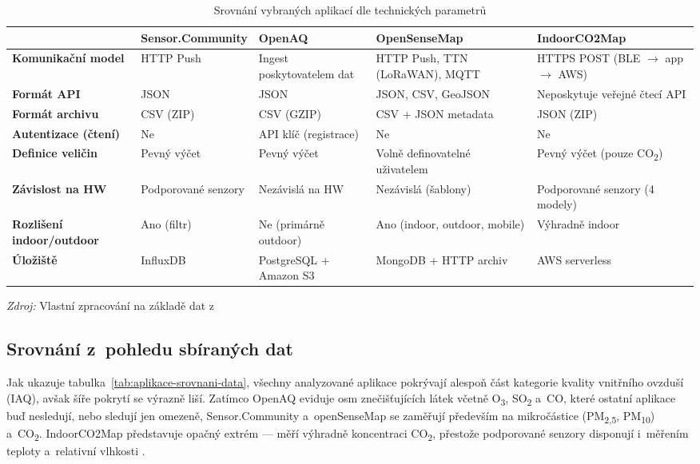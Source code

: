 \begin{table}[!tbp]
  \centering
  \footnotesize
  \setlength{\tabcolsep}{2pt}
  \renewcommand{\arraystretch}{1.1}
  \caption{Srovnání vybraných aplikací dle technických parametrů}
  \label{tab:aplikace-srovnani-technicke}
  \begin{tabular}{p{2.8cm}p{3.1cm}p{3.0cm}p{3.0cm}p{2.7cm}}
    \toprule
     & \textbf{Sensor.Community} & \textbf{OpenAQ} & \textbf{OpenSenseMap} & \textbf{IndoorCO2Map}\\
    \midrule
      \textbf{Komunikační model} & HTTP Push & Ingest poskytovatelem dat & HTTP Push, TTN (LoRaWAN), MQTT & HTTPS POST (BLE $\rightarrow$ app $\rightarrow$ AWS)\\
    \midrule
      \textbf{Formát API} & JSON & JSON & JSON, CSV, {GeoJSON} & Neposkytuje veřejné čtecí API\\
    \midrule
      \textbf{Formát archivu} & CSV (ZIP) & CSV (GZIP) & CSV + JSON metadata & JSON (ZIP)\\
    \midrule
      \textbf{Autentizace (čtení)} & Ne & API klíč (registrace) & Ne & Ne\\
    \midrule
      \textbf{Definice veličin} & Pevný výčet & Pevný výčet & Volně definovatelné uživatelem & Pevný výčet (pouze CO\textsubscript{2})\\
    \midrule
      \textbf{Závislost na HW} & Podporované senzory & Nezávislá na HW & Nezávislá (šablony) & Podporované senzory (4 modely)\\
    \midrule
      \textbf{Rozlišení indoor/outdoor} & Ano (filtr) & Ne (primárně outdoor) & Ano (indoor, outdoor, mobile) & Výhradně indoor\\
    \midrule
      \textbf{Úložiště} & InfluxDB & PostgreSQL + Amazon S3 & MongoDB + HTTP archiv & AWS serverless\\
    \bottomrule
  \end{tabular}

  \footnotesize \textit{Zdroj:} Vlastní zpracování na základě dat z \parencite{Index, APIs, API, zotero-item-552, OpenaqOpenaqapiv22026, aurelwuAurelWuIndoorCO2MapApp2026, zotero-item-571, IndoorCO2Atlas}
\end{table}

\FloatBarrier
\subsection{Srovnání z~pohledu sbíraných dat}

Jak ukazuje tabulka~\ref{tab:aplikace-srovnani-data}, všechny analyzované aplikace pokrývají alespoň část kategorie kvality vnitřního ovzduší (IAQ), avšak šíře pokrytí se výrazně liší. Zatímco OpenAQ eviduje osm znečišťujících látek včetně O\textsubscript{3}, SO\textsubscript{2} a~CO, které ostatní aplikace buď nesledují, nebo sledují jen omezeně, Sensor.Community a~openSenseMap se zaměřují především na mikročástice (PM\textsubscript{2,5}, PM\textsubscript{10}) a~CO\textsubscript{2}. IndoorCO2Map představuje opačný extrém --- měří výhradně koncentraci CO\textsubscript{2}, přestože podporované senzory disponují i~měřením teploty a~relativní vlhkosti \parencite{aurelwuAurelWuIndoorCO2MapApp2026}.

